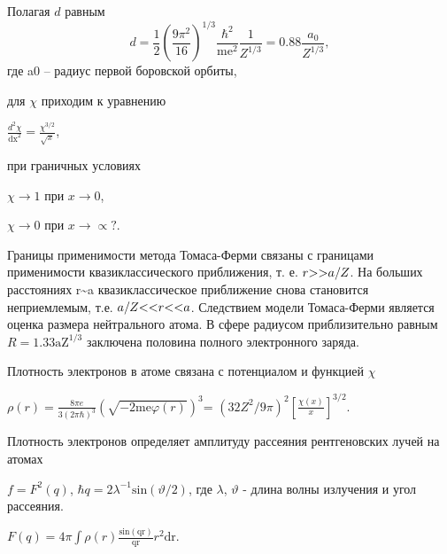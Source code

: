 \documentclass[a4paper,14pt, openany, twoside, draft]{extbook} %
\begin{document}
Полагая $d$ равным
\begin{equation*}
\label{eq:kulonfield}
d=\frac 1 2\left(\frac{9\pi ^2}{16}\right)^{1/3}\frac{\hbar ^2}{{\text{me}}^2}\frac 1{Z^{1/3}}=0.88\frac{a_0}{Z^{1/3}},
\end{equation*}
где a0 – радиус первой боровской орбиты,

для ${\chi}$  приходим к уравнению

 $\frac{d^2\chi }{{\text{dx}}^2}=\frac{\chi ^{3/2}}{\sqrt x}$,

при граничных условиях

 $\chi \rightarrow 1$ при  $x\rightarrow 0$,

 $\chi \rightarrow 0$ при  $x\rightarrow \propto ?$.

Границы применимости метода Томаса-Ферми связаны с границами применимости квазиклассического приближения, т. е.  $r\text{{\textgreater}{\textgreater}}a/Z$. На больших расстояниях r\~{}a квазиклассическое приближение снова становится неприемлемым, т.е.  $a/Z\text{{\textless}{\textless}}r\text{{\textless}{\textless}}a$. Следствием модели Томаса-Ферми является оценка размера нейтрального атома. В сфере радиусом приблизительно равным  $R=1.33{\text{aZ}}^{1/3}$ заключена половина полного электронного заряда.

Плотность электронов в атоме связана с потенциалом и функцией  $\chi $

 $\rho (r)=\frac{8\mathit{\pi e}}{3(2\pi \hbar )^3}\left(\sqrt{-2{\text{me}}\varphi (r)}\right)^3$= $\left(32Z^2/9\pi \right)^2\left[\frac{\chi (x)} x\right]^{3/2}$.

Плотность электронов определяет амплитуду рассеяния рентгеновских лучей на атомах

 $f=F^2(q)$,  $\hbar q=2\lambda ^{-1}\text{sin}(\vartheta /2)$, где ${\lambda}$,  $\vartheta $ - длина волны излучения и угол рассеяния.

 $F(q)=4\pi \int \rho (r)\frac{\text{sin}({\text{qr}})}{{\text{qr}}}r^2{\text{dr}}$.\ \ \ \
\end{document}
